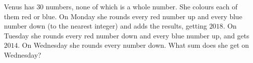 Venus has $30$ numbers, none of which is a whole number. She colours each of them red or blue. On Monday she rounds every red number up and every blue number down (to the nearest integer) and adds the results, getting $2018$. On Tuesday she rounds every red number down and every blue number up, and gets $2014$. On Wednesday she rounds every number down. What sum does she get on Wednesday?
